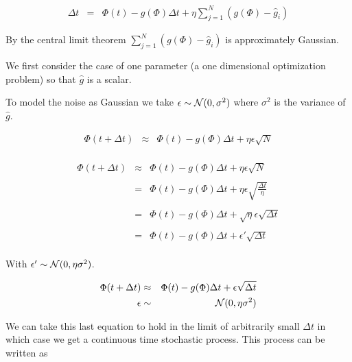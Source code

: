 {

\begin{eqnarray*}
\Delta t & = &  \Phi(t) -g(\Phi)\Delta t + \eta \sum_{j=1}^N (g(\Phi) - \hat{g}_i)
\end{eqnarray*}


\vfill
By the central limit theorem $\sum_{j=1}^N (g(\Phi) - \hat{g}_i)$ is approximately Gaussian.


We first consider the case of one parameter (a one dimensional optimization problem) so that $\hat{g}$ is a scalar.

\vfill
To model the noise as Gaussian we take $\epsilon \sim {\cal N}(0,\sigma^2)$ where $\sigma^2$ is the variance of $\hat{g}$.

\begin{eqnarray*}
\Phi(t + \Delta t) & \approx & \Phi(t) -g(\Phi)\Delta t + \eta \epsilon \sqrt{N} \\
\end{eqnarray*}


\begin{eqnarray*}
\Phi(t + \Delta t) & \approx & \Phi(t) -g(\Phi)\Delta t +  \eta \epsilon \sqrt{N} \\
\\
& = & \Phi(t) -g(\Phi)\Delta t +  \eta \epsilon \sqrt{\frac{\Delta t}{\eta}} \\
\\
& = & \Phi(t) -g(\Phi)\Delta t +  \sqrt{\eta} \epsilon \sqrt{\Delta t} \\
\\
& = & \Phi(t) -g(\Phi)\Delta t +  \epsilon' \sqrt{\Delta t} \\
\end{eqnarray*}

\vfill
With $\epsilon' \sim {\cal N}(0,\eta \sigma^2)$.




\begin{eqnarray*}
\Phi(t + \Delta t) & \approx & \Phi(t) -g(\Phi)\Delta t +  \epsilon \sqrt{\Delta t} \\
\epsilon & \sim & {\cal N}(0,\eta\sigma^2)
\end{eqnarray*}

\vfill
We can take this last equation to hold in the limit of arbitrarily small $\Delta t$ in which case we get a continuous time stochastic process.  This process can be written as

}
